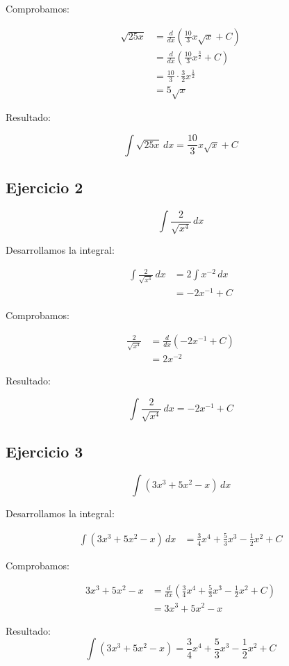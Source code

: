 \documentclass[12pts]{article}
\begin{document}
	Comprobamos:

	\begin{align*}
		\sqrt{25x} &= \frac{d}{dx} \left( \frac{10}{3} x \sqrt{x} + C \right) \\
		&= \frac{d}{dx} \left( \frac{10}{3} x^{ \frac{3}{2} } + C \right) \\
		&= \frac{10}{3} \cdot \frac{3}{2} x^{ \frac{1}{2} } \\
		&= 5 \sqrt{x}
	\end{align*}

	Resultado:
	
	\[ \int \sqrt{25x} \, dx = \frac{10}{3} x \sqrt{x} + C \]

	\newpage
	\subsection*{Ejercicio 2}

	\[ \int \frac{2}{ \sqrt{ x^{4} }} \, dx \]

	Desarrollamos la integral:

	\begin{align*}
		\int \frac{2}{ \sqrt{ x^{4} }} \, dx &= 2 \int x^{-2} \, dx \\
		&= -2x^{-1} + C
	\end{align*}

	Comprobamos:

	\begin{align*}
		\frac{2}{ \sqrt{ x^{4} }} &= \frac{d}{dx} \left( -2x^{-1} + C \right) \\
		&= 2x^{-2}
	\end{align*}

	Resultado:

	\[ \int \frac{2}{ \sqrt{ x^{4} }} \, dx = -2x^{-1} + C \]

	\newpage
	\subsection*{Ejercicio 3}

	\[ \int \left( 3x^{3} + 5x^{2} - x \right) \, dx \]

	Desarrollamos la integral:

	\begin{align*}
		\int \left( 3x^{3} + 5x^{2} - x \right) \, dx &= \frac{3}{4} x^{4} + \frac{5}{3} x^{3} - \frac{1}{2} x^{2} + C
	\end{align*}

	Comprobamos:

	\begin{align*}
		3x^{3} + 5x^{2} - x &= \frac{d}{dx} \left( \frac{3}{4} x^{4} + \frac{5}{3} x^{3} - \frac{1}{2} x^2 + C \right) \\
		&= 3x^{3} + 5x^{2} - x
	\end{align*}

	Resultado:
	\[ \int \left( 3x^{3} + 5x^{2} - x \right) = \frac{3}{4} x^{4} + \frac{5}{3} x^{3} - \frac{1}{2} x^{2} + C \]
\end{document}
